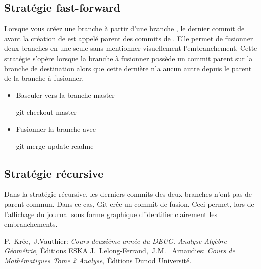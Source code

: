 \documentclass[11pt, a4paper]{book}
\begin{document}
\subsection{Stratégie fast-forward}
Lorsque vous créez une branche  à partir d'une branche , le dernier commit de  avant la création de  est appelé parent des commits de . Elle permet de fusionner deux branches en une seule sans mentionner visuellement l'embranchement. Cette stratégie s'opère lorsque la  branche à fusionner possède un commit parent sur la branche de destination alors que cette dernière n'a aucun autre depuis le parent de la branche à fusionner.
\begin{itemize}
\item Basculer vers la branche master 
\begin{bash}
git checkout master
\end{bash}
\item Fusionner la branche  avec 
\begin{bash}
git merge update-readme
\end{bash}
\end{itemize}

\subsection{Stratégie récursive}
Dans la stratégie récursive, les derniers commits des deux branches n'ont pas de parent commun. Dans ce cas, Git crée un commit de fusion. Ceci permet, lors de l'affichage du journal sous forme graphique d'identifier clairement les embranchements. 
\begin{thebibliography}{99} 
 P.~Kr\'ee,~J.Vauthier: \emph{Cours deuxi\`eme ann\'ee du DEUG. Analyse-Alg\`ebre-G\'eom\'etrie,}  
\'Editions ESKA 
 J.~Lelong-Ferrand,~J.M. ~Arnaudies: \emph{Cours de Math\'ematiques Tome 2 Analyse},  
\'Editions Dunod Universit\'e.
\end{thebibliography}
\end{document}
